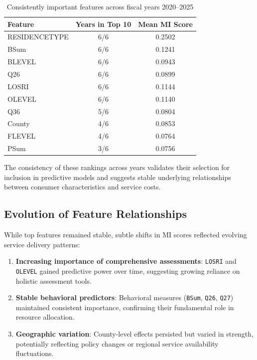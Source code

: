 \begin{table}[htbp]
\centering
\caption{Consistently important features across fiscal years 2020--2025}
\label{tab:consistent-features}
\begin{tabular}{lcc}
\hline
\textbf{Feature} & \textbf{Years in Top 10} & \textbf{Mean MI Score} \\
\hline
RESIDENCETYPE & 6/6 & 0.2502 \\
BSum & 6/6 & 0.1241 \\
BLEVEL & 6/6 & 0.0943 \\
Q26 & 6/6 & 0.0899 \\
LOSRI & 6/6 & 0.1144 \\
OLEVEL & 6/6 & 0.1140 \\
Q36 & 5/6 & 0.0804 \\
County & 4/6 & 0.0853 \\
FLEVEL & 4/6 & 0.0764 \\
PSum & 3/6 & 0.0756 \\
\hline
\end{tabular}
\end{table}

The consistency of these rankings across years validates their selection for inclusion in predictive models and suggests stable underlying relationships between consumer characteristics and service costs.

\subsection{Evolution of Feature Relationships}
\label{subsec:evolution-relationships}

While top features remained stable, subtle shifts in MI scores reflected evolving service delivery patterns:

\begin{enumerate}
    \item \textbf{Increasing importance of comprehensive assessments}: \texttt{LOSRI} and \texttt{OLEVEL} gained predictive power over time, suggesting growing reliance on holistic assessment tools.
    
    \item \textbf{Stable behavioral predictors}: Behavioral measures (\texttt{BSum}, \texttt{Q26}, \texttt{Q27}) maintained consistent importance, confirming their fundamental role in resource allocation.
    
    \item \textbf{Geographic variation}: County-level effects persisted but varied in strength, potentially reflecting policy changes or regional service availability fluctuations.
\end{enumerate}

